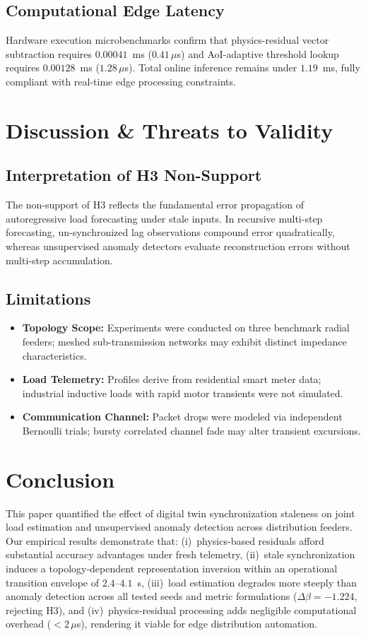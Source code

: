 \documentclass[journal]{IEEEtran}
\newcommand{\dbeta}{\Delta\beta}
\begin{document}
\subsection{Computational Edge Latency}
Hardware execution microbenchmarks confirm that physics-residual vector subtraction requires $0.00041$~ms ($0.41\,\mu$s) and AoI-adaptive threshold lookup requires $0.00128$~ms ($1.28\,\mu$s). Total online inference remains under $1.19$~ms, fully compliant with real-time edge processing constraints.


\section{Discussion & Threats to Validity}
\label{sec:discussion}

\subsection{Interpretation of H3 Non-Support}
The non-support of H3 reflects the fundamental error propagation of autoregressive load forecasting under stale inputs. In recursive multi-step forecasting, un-synchronized lag observations compound error quadratically, whereas unsupervised anomaly detectors evaluate reconstruction errors without multi-step accumulation.

\subsection{Limitations}
\begin{itemize}
    \item \textbf{Topology Scope:} Experiments were conducted on three benchmark radial feeders; meshed sub-transmission networks may exhibit distinct impedance characteristics.
    \item \textbf{Load Telemetry:} Profiles derive from residential smart meter data; industrial inductive loads with rapid motor transients were not simulated.
    \item \textbf{Communication Channel:} Packet drops were modeled via independent Bernoulli trials; bursty correlated channel fade may alter transient excursions.
\end{itemize}


\section{Conclusion}
\label{sec:conclusion}

This paper quantified the effect of digital twin synchronization staleness on joint load estimation and unsupervised anomaly detection across distribution feeders. Our empirical results demonstrate that: (i)~physics-based residuals afford substantial accuracy advantages under fresh telemetry, (ii)~stale synchronization induces a topology-dependent representation inversion within an operational transition envelope of $2.4$--$4.1$~s, (iii)~load estimation degrades more steeply than anomaly detection across all tested seeds and metric formulations ($\dbeta = -1.224$, rejecting H3), and (iv)~physics-residual processing adds negligible computational overhead ($<2\,\mu$s), rendering it viable for edge distribution automation.
\end{document}
